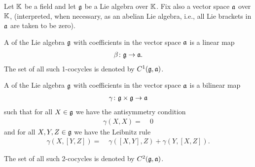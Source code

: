 
Let $\mathbb{K}$ be a field and let $\mathfrak{g}$ be a Lie algebra over $\mathbb{K}$.
Fix also a vector space $\mathfrak{a}$ over $\mathbb{K}$, (interpreted, when necessary,
as an abelian Lie algebra, i.e., all Lie brackets in $\mathfrak{a}$ are taken to
be zero).

\begin{definition}
  \label{def:LieOneCocycle}
  \leanok
  A  of the Lie algebra $\mathfrak{g}$ with coefficients in the vector
  space $\mathfrak{a}$ is a linear map
  \begin{align*}
    \beta \colon \mathfrak{g} \to \mathfrak{a} .
  \end{align*}
  The set of all such 1-cocycles is denoted by $C^1(\mathfrak{g}, \mathfrak{a})$.
\end{definition}

\begin{definition}
  \label{def:LieTwoCocycle}
  \leanok
  A  of the Lie algebra $\mathfrak{g}$ with coefficients in the vector
  space $\mathfrak{a}$ is a bilinear map
  \begin{align*}
    \gamma \colon \mathfrak{g} \times \mathfrak{g} \to \mathfrak{a}
  \end{align*}
  such that for all $X \in \mathfrak{g}$ we have the antisymmetry condition
  \begin{align}\label{eq:LieTwoCocycle.self}
    \gamma(X,X) = \; & 0
  \end{align}
  and for all $X,Y,Z \in \mathfrak{g}$ we have the Leibnitz rule
  \begin{align}\label{eq:LieTwoCocycle.leibniz}
    \gamma(X,[Y,Z]) = \; & \gamma([X,Y],Z) + \gamma(Y,[X,Z]) .
  \end{align}

  The set of all such 2-cocycles is denoted by $C^2(\mathfrak{g}, \mathfrak{a})$.
\end{definition}

